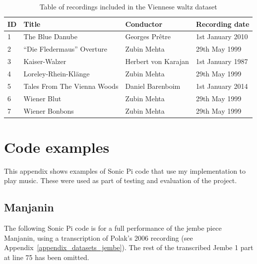 \documentclass[12pt,twoside,openright]{report}
\begin{document}
\begin{table}[ht]
    \begin{tabularx}{\linewidth}{
        l
        >{\raggedright\arraybackslash}X
        l
        l
    }
        \toprule
        ID & Title & Conductor & Recording date \\
        \midrule
        1 & The Blue Danube & Georges Prêtre & 1st January 2010 \\
        2 & ``Die Fledermaus'' Overture & Zubin Mehta & 29th May 1999 \\
        3 & Kaiser-Walzer & Herbert von Karajan & 1st January 1987 \\
        4 & Loreley-Rhein-Klänge & Zubin Mehta & 29th May 1999 \\
        5 & Tales From The Vienna Woods & Daniel Barenboim & 1st January 2014 \\
        6 & Wiener Blut & Zubin Mehta & 29th May 1999 \\
        7 & Wiener Bonbons & Zubin Mehta & 29th May 1999 \\
        \bottomrule
    \end{tabularx}
    \caption{Table of recordings included in the Viennese waltz dataset}
    \label{table:waltz_dataset}
\end{table}





\chapter{Code examples} \label{appendix_code_examples}

This appendix shows examples of Sonic Pi code that use my implementation to play music. These were used as part of testing and evaluation of the project.



\section*{Manjanin} \label{appendix_code_manjanin}

The following Sonic Pi code is for a full performance of the jembe piece Manjanin, using a transcription of Polak's 2006 recording (see Appendix~\ref{appendix_datasets_jembe}). The rest of the transcribed Jembe 1 part at line 75 has been omitted.

\inputminted[linenos=true]{ruby}{figures/manjanin_code.rb}
\end{document}
